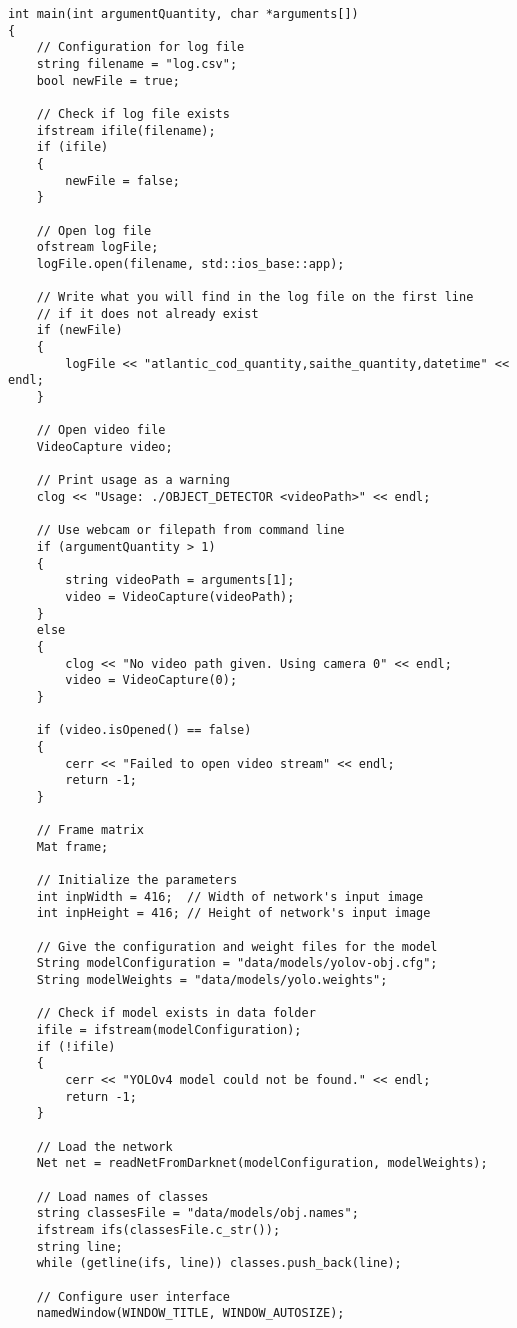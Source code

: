 \label{lst:main}
\begin{verbatim}
int main(int argumentQuantity, char *arguments[])
{
    // Configuration for log file
    string filename = "log.csv";
    bool newFile = true;

    // Check if log file exists
    ifstream ifile(filename);
    if (ifile)
    {
        newFile = false;
    }

    // Open log file
    ofstream logFile;
    logFile.open(filename, std::ios_base::app);

    // Write what you will find in the log file on the first line
    // if it does not already exist
    if (newFile)
    {
        logFile << "atlantic_cod_quantity,saithe_quantity,datetime" << endl;
    }

    // Open video file
    VideoCapture video;

    // Print usage as a warning
    clog << "Usage: ./OBJECT_DETECTOR <videoPath>" << endl;

    // Use webcam or filepath from command line
    if (argumentQuantity > 1)
    {
        string videoPath = arguments[1];
        video = VideoCapture(videoPath);
    }
    else
    {
        clog << "No video path given. Using camera 0" << endl;
        video = VideoCapture(0);
    }

    if (video.isOpened() == false)
    {
        cerr << "Failed to open video stream" << endl;
        return -1;
    }

    // Frame matrix
    Mat frame;

    // Initialize the parameters
    int inpWidth = 416;  // Width of network's input image
    int inpHeight = 416; // Height of network's input image

    // Give the configuration and weight files for the model
    String modelConfiguration = "data/models/yolov-obj.cfg";
    String modelWeights = "data/models/yolo.weights";

    // Check if model exists in data folder
    ifile = ifstream(modelConfiguration);
    if (!ifile)
    {
        cerr << "YOLOv4 model could not be found." << endl;
        return -1;
    }

    // Load the network
    Net net = readNetFromDarknet(modelConfiguration, modelWeights);

    // Load names of classes
    string classesFile = "data/models/obj.names";
    ifstream ifs(classesFile.c_str());
    string line;
    while (getline(ifs, line)) classes.push_back(line);

    // Configure user interface
    namedWindow(WINDOW_TITLE, WINDOW_AUTOSIZE);
\end{verbatim}

